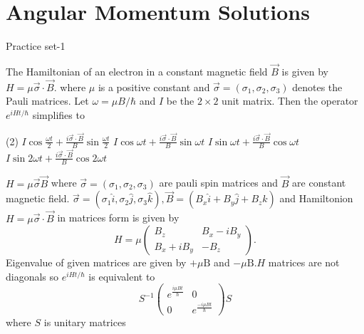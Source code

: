\chapter{Angular Momentum Solutions}
\begin{abox}
	Practice set-1 
	\end{abox}
\begin{enumerate}
	\begin{minipage}{\textwidth}
		\item The Hamiltonian of an electron in a constant magnetic field $\vec{B}$ is given by $H=\mu \vec{\sigma} \cdot \vec{B}$. where $\mu$ is a positive constant and $\vec{\sigma}=\left(\sigma_{1}, \sigma_{2}, \sigma_{3}\right)$ denotes the Pauli matrices. Let $\omega=\mu B / \hbar$ and $I$ be the $2 \times 2$ unit matrix. Then the operator $e^{i H t / \hbar}$ simplifies to
	\end{minipage}
	\begin{tasks}(2)
		\task[\textbf{A.}] $I \cos \frac{\omega t}{2}+\frac{i \vec{\sigma} \cdot \vec{B}}{B} \sin \frac{\omega t}{2}$
		\task[\textbf{B.}]$I \cos \omega t+\frac{i \vec{\sigma} \cdot \vec{B}}{B} \sin \omega t$
		\task[\textbf{C.}]$I \sin \omega t+\frac{i \vec{\sigma} \cdot \vec{B}}{B} \cos \omega t$
		\task[\textbf{D.}]$I \sin 2 \omega t+\frac{i \vec{\sigma} \cdot \vec{B}}{B} \cos 2 \omega t$
	\end{tasks}
\begin{answer}
	$H=\mu \vec{\sigma} \vec{B}$ where $\vec{\sigma}=\left(\sigma_{1}, \sigma_{2}, \sigma_{3}\right)$ are pauli spin matrices and $\vec{B}$ are constant magnetic field. $\vec{\sigma}=\left(\sigma_{1} \hat{i}, \sigma_{2} \hat{j}, \sigma_{3} \hat{k}\right), \vec{B}=\left(B_{x} \hat{i}+B_{y} \hat{j}+B_{z} \hat{k}\right)$ and Hamiltonion $H=\mu \vec{\sigma} \cdot \vec{B}$ in matrices form is given by
	$$
	H=\mu\left(\begin{array}{cc}
	B_{z} & B_{x}-i B_{y} \\
	B_{x}+i B_{y} & -B_{z}
	\end{array}\right) .
	$$
	Eigenvalue of given matrices are given by $+\mu \mathrm{B}$ and $-\mu \mathrm{B} . H$ matrices are not diagonals so $e^{i H t / \hbar}$ is equivalent to
	$$
	S^{-1}\left(\begin{array}{cc}
	e^{\frac{i \mu B t}{\hbar}} & 0 \\
	0 & e^{\frac{-i \mu B t}{\hbar}}
	\end{array}\right) S
	$$
	where $S$ is unitary matrices\\

\end{answer}
\end{enumerate}

